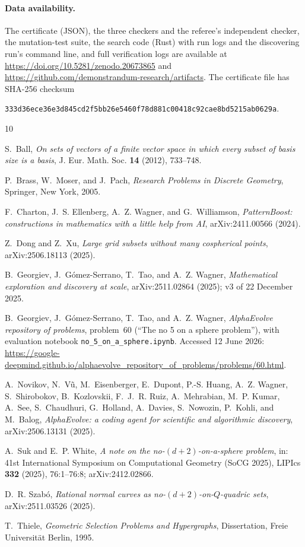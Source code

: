 \documentclass[10pt]{article}
\theoremstyle{remark}
\begin{document}
\paragraph{Data availability.}
The certificate (JSON), the three checkers and the referee's independent
checker, the mutation-test suite, the search code (Rust) with run logs and
the discovering run's command line, and full verification logs are
available at \url{https://doi.org/10.5281/zenodo.20673865} and
\url{https://github.com/demonstrandum-research/artifacts}. The certificate file
has SHA-256 checksum
\begin{center}
\texttt{\small 333d36ece36e3d845cd2f5bb26e5460f78d881c00418c92cae8bd5215ab0629a}.
\end{center}

\begingroup\small
\begin{thebibliography}{10}

S.~Ball,
\emph{On sets of vectors of a finite vector space in which every subset of
basis size is a basis},
J. Eur. Math. Soc. \textbf{14} (2012), 733--748.

P.~Brass, W.~Moser, and J.~Pach,
\emph{Research Problems in Discrete Geometry},
Springer, New York, 2005.

F.~Charton, J.~S. Ellenberg, A.~Z. Wagner, and G.~Williamson,
\emph{PatternBoost: constructions in mathematics with a little help from AI},
arXiv:2411.00566 (2024).

Z.~Dong and Z.~Xu,
\emph{Large grid subsets without many cospherical points},
arXiv:2506.18113 (2025).

B.~Georgiev, J.~G\'omez-Serrano, T.~Tao, and A.~Z. Wagner,
\emph{Mathematical exploration and discovery at scale},
arXiv:2511.02864 (2025); v3 of 22 December 2025.

B.~Georgiev, J.~G\'omez-Serrano, T.~Tao, and A.~Z. Wagner,
\emph{AlphaEvolve repository of problems}, problem~60 (``The no 5 on a
sphere problem''), with evaluation notebook
\texttt{no\_5\_on\_a\_sphere.ipynb}. Accessed 12 June 2026:
\url{https://google-deepmind.github.io/alphaevolve_repository_of_problems/problems/60.html}.

A.~Novikov, N.~V\~u, M.~Eisenberger, E.~Dupont, P.-S. Huang, A.~Z. Wagner,
S.~Shirobokov, B.~Kozlovskii, F.~J.~R. Ruiz, A.~Mehrabian, M.~P. Kumar,
A.~See, S.~Chaudhuri, G.~Holland, A.~Davies, S.~Nowozin, P.~Kohli, and
M.~Balog,
\emph{AlphaEvolve: a coding agent for scientific and algorithmic discovery},
arXiv:2506.13131 (2025).

A.~Suk and E.~P. White,
\emph{A note on the no-$(d+2)$-on-a-sphere problem},
in: 41st International Symposium on Computational Geometry (SoCG 2025),
LIPIcs \textbf{332} (2025), 76:1--76:8; arXiv:2412.02866.

D.~R. Szab\'o,
\emph{Rational normal curves as no-$(d+2)$-on-$Q$-quadric sets},
arXiv:2511.03526 (2025).

T.~Thiele,
\emph{Geometric Selection Problems and Hypergraphs},
Dissertation, Freie Universit\"at Berlin, 1995.

\end{thebibliography}
\endgroup
\end{document}
